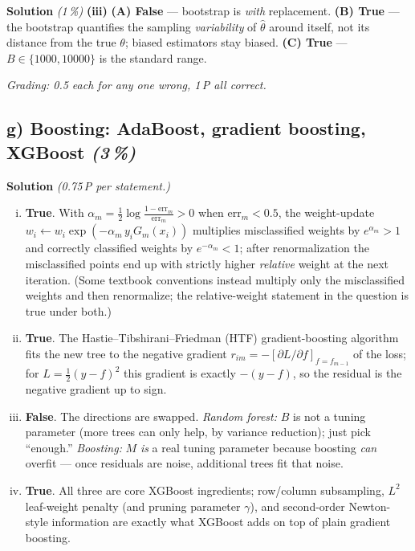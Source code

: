 \documentclass[11pt,a4paper]{article}
\newcommand{\subpoints}[1]{\textit{(#1\,\%)}}
\newcommand{\sol}{\noindent\textbf{Solution}}
\begin{document}
\medskip
\sol{} \subpoints{1} \textbf{(iii)} \textbf{(A) False} --- bootstrap is \emph{with} replacement.
\textbf{(B) True} --- the bootstrap quantifies the sampling \emph{variability} of $\hat\theta$
around itself, not its distance from the true $\theta$; biased estimators stay biased.
\textbf{(C) True} --- $B\in\{1000, 10000\}$ is the standard range.

\noindent\emph{Grading: 0.5 each for any one wrong, 1\,P all correct.}

\subsection*{g) Boosting: AdaBoost, gradient boosting, XGBoost \subpoints{3}}
\sol{} \emph{(0.75\,P per statement.)}
\begin{enumerate}[(i)]
  \item \textbf{True}. With $\alpha_m=\tfrac{1}{2}\log\tfrac{1-\mathrm{err}_m}{\mathrm{err}_m}>0$
        when $\mathrm{err}_m<0.5$, the weight-update $w_i\leftarrow w_i\exp(-\alpha_m\,y_i G_m(x_i))$
        multiplies misclassified weights by $e^{\alpha_m}>1$ and correctly classified weights by
        $e^{-\alpha_m}<1$; after renormalization the misclassified points end up with strictly
        higher \emph{relative} weight at the next iteration. (Some textbook conventions instead
        multiply only the misclassified weights and then renormalize; the relative-weight statement
        in the question is true under both.)
  \item \textbf{True}. The Hastie--Tibshirani--Friedman (HTF) gradient-boosting algorithm fits
        the new tree to the negative gradient $r_{im}=-[\partial L/\partial f]_{f=f_{m-1}}$ of the
        loss; for $L=\tfrac{1}{2}(y-f)^2$ this gradient is exactly $-(y-f)$, so the residual is the
        negative gradient up to sign.
  \item \textbf{False}. The directions are swapped. \emph{Random forest:} $B$ is not a tuning
        parameter (more trees can only help, by variance reduction); just pick ``enough.''
        \emph{Boosting:} $M$ \emph{is} a real tuning parameter because boosting \emph{can} overfit
        --- once residuals are noise, additional trees fit that noise.
  \item \textbf{True}. All three are core XGBoost ingredients; row/column subsampling, $L^2$
        leaf-weight penalty (and pruning parameter $\gamma$), and second-order Newton-style
        information are exactly what XGBoost adds on top of plain gradient boosting.
\end{enumerate}
\end{document}
